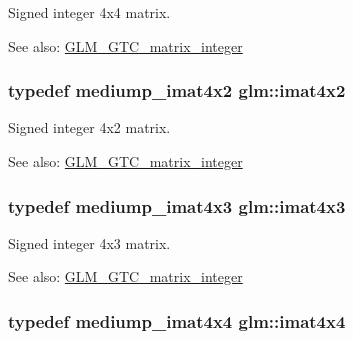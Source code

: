 Signed integer 4x4 matrix. \begin{Desc}
\item[See also:]\hyperlink{group__gtc__matrix__integer}{GLM\_\-GTC\_\-matrix\_\-integer} \end{Desc}
\hypertarget{group__gtc__matrix__integer_g7e733984837e0e7aa9f4aac18f632f63}{
\subsubsection[imat4x2]{\setlength{\rightskip}{0pt plus 5cm}typedef mediump\_\-imat4x2 {\bf glm::imat4x2}}}
\label{group__gtc__matrix__integer_g7e733984837e0e7aa9f4aac18f632f63}


Signed integer 4x2 matrix. \begin{Desc}
\item[See also:]\hyperlink{group__gtc__matrix__integer}{GLM\_\-GTC\_\-matrix\_\-integer} \end{Desc}
\hypertarget{group__gtc__matrix__integer_ga4cca8e80c0603239eda452860063844}{
\subsubsection[imat4x3]{\setlength{\rightskip}{0pt plus 5cm}typedef mediump\_\-imat4x3 {\bf glm::imat4x3}}}
\label{group__gtc__matrix__integer_ga4cca8e80c0603239eda452860063844}


Signed integer 4x3 matrix. \begin{Desc}
\item[See also:]\hyperlink{group__gtc__matrix__integer}{GLM\_\-GTC\_\-matrix\_\-integer} \end{Desc}
\hypertarget{group__gtc__matrix__integer_g367d8d5281ff82f1215a227dd2ea5ba9}{
\subsubsection[imat4x4]{\setlength{\rightskip}{0pt plus 5cm}typedef mediump\_\-imat4x4 {\bf glm::imat4x4}}}
\label{group__gtc__matrix__integer_g367d8d5281ff82f1215a227dd2ea5ba9}


